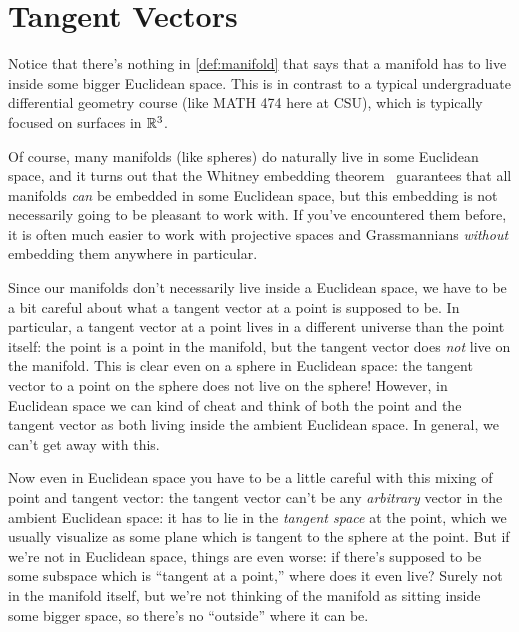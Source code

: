 
\section{Tangent Vectors}

Notice that there's nothing in \cref{def:manifold} that says that a manifold has to live inside some bigger Euclidean space. This is in contrast to a typical undergraduate differential geometry course (like MATH 474 here at CSU), which is typically focused on surfaces in $\mathbb{R}^3$. 

Of course, many manifolds (like spheres) do naturally live in some Euclidean space, and it turns out that the Whitney embedding theorem~\cite{whitneySelfintersectionsSmoothnmanifold1944,whitneySingularitiesSmoothnmanifold1944} guarantees that all manifolds \emph{can} be embedded in some Euclidean space, but this embedding is not necessarily going to be pleasant to work with. If you've encountered them before, it is often much easier to work with projective spaces and Grassmannians \emph{without} embedding them anywhere in particular.

Since our manifolds don't necessarily live inside a Euclidean space, we have to be a bit careful about what a tangent vector at a point is supposed to be. In particular, a tangent vector at a point lives in a different universe than the point itself: the point is a point in the manifold, but the tangent vector does \emph{not} live on the manifold. This is clear even on a sphere in Euclidean space: the tangent vector to a point on the sphere does not live on the sphere! However, in Euclidean space we can kind of cheat and think of both the point and the tangent vector as both living inside the ambient Euclidean space. In general, we can't get away with this.

Now even in Euclidean space you have to be a little careful with this mixing of point and tangent vector: the tangent vector can't be any \emph{arbitrary} vector in the ambient Euclidean space: it has to lie in the \emph{tangent space} at the point, which we usually visualize as some plane which is tangent to the sphere at the point. But if we're not in Euclidean space, things are even worse: if there's supposed to be some subspace which is ``tangent at a point,'' where does it even live? Surely not in the manifold itself, but we're not thinking of the manifold as sitting inside some bigger space, so there's no ``outside'' where it can be.

